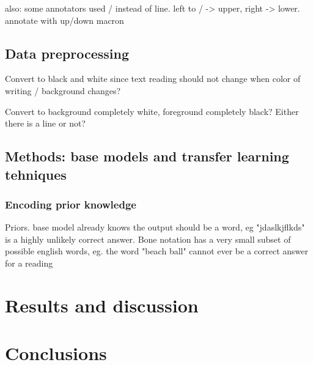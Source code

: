 \documentclass{article}
\begin{document}
also: some annotators used / instead of line. left to / -> upper, right -> lower.
annotate with up/down macron

\subsection{Data preprocessing}

Convert to black and white since text reading should not change when color of writing / background changes?

Convert to background completely white, foreground completely black? Either there is a line or not?

\subsection{Methods: base models and transfer learning tehniques}

\subsubsection{Encoding prior knowledge}
Priors. base model already knows the output should be a word, eg "jdaslkjflkds" is a highly unlikely
correct answer.
Bone notation has a very small subset of possible english words, eg. the word "beach ball" cannot ever be a correct 
answer for a reading


\section{Results and discussion}



\section{Conclusions}

\printbibliography
\end{document}
